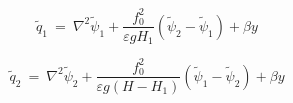 \begin{equation}
\tilde{q}_1 \ = \ \nabla^2 \tilde{\psi}_1 + \frac{f_0^2}{\varepsilon g H_1} \left ( \tilde{\psi}_2 - \tilde{\psi}_1 \right ) + \beta y
\label{vpqg_c1}
\end{equation}

\begin{equation}
\tilde{q}_2 \ = \ \nabla^2 \tilde{\psi}_2 + \frac{f_0^2}{\varepsilon g \left ( H - H_1 \right )} \left ( \tilde{\psi}_1 - \tilde{\psi}_2 \right ) + \beta y
\label{vpqg_c2}
\end{equation}
